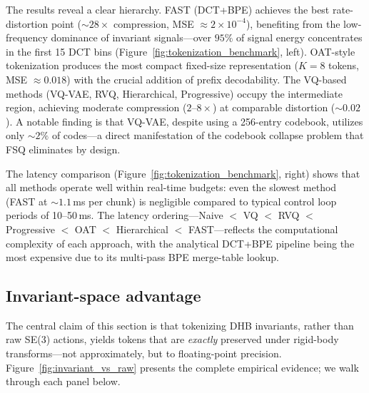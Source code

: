 \documentclass[11pt]{article}
\begin{document}
The results reveal a clear hierarchy. FAST (DCT+BPE) achieves the best rate-distortion point (${\sim}28\times$ compression, MSE $\approx 2\times 10^{-4}$), benefiting from the low-frequency dominance of invariant signals---over $95\%$ of signal energy concentrates in the first 15 DCT bins (Figure~\ref{fig:tokenization_benchmark}, left). OAT-style tokenization produces the most compact fixed-size representation ($K=8$ tokens, MSE $\approx 0.018$) with the crucial addition of prefix decodability. The VQ-based methods (VQ-VAE, RVQ, Hierarchical, Progressive) occupy the intermediate region, achieving moderate compression ($2$--$8\times$) at comparable distortion (${\sim}0.02$). A notable finding is that VQ-VAE, despite using a 256-entry codebook, utilizes only ${\sim}2\%$ of codes---a direct manifestation of the codebook collapse problem that FSQ eliminates by design.

The latency comparison (Figure~\ref{fig:tokenization_benchmark}, right) shows that all methods operate well within real-time budgets: even the slowest method (FAST at ${\sim}1.1$\,ms per chunk) is negligible compared to typical control loop periods of 10--50\,ms. The latency ordering---Naive $<$ VQ $<$ RVQ $<$ Progressive $<$ OAT $<$ Hierarchical $<$ FAST---reflects the computational complexity of each approach, with the analytical DCT+BPE pipeline being the most expensive due to its multi-pass BPE merge-table lookup.

\subsection{Invariant-space advantage}
\label{sec:invariant-space-advantage}

The central claim of this section is that tokenizing DHB invariants, rather than raw SE(3) actions, yields tokens that are \emph{exactly} preserved under rigid-body transforms---not approximately, but to floating-point precision. Figure~\ref{fig:invariant_vs_raw} presents the complete empirical evidence; we walk through each panel below.
\end{document}
